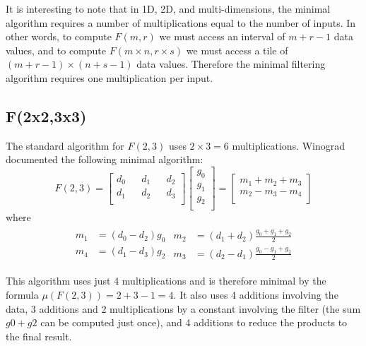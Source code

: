 \documentclass[10pt,twocolumn,letterpaper]{article}
\begin{document}
It is interesting to note that in 1D, 2D, and multi-dimensions, the minimal algorithm requires a number of multiplications equal to the number of inputs. In other words, to compute $F(m,r)$ we must access an interval  of $m+r-1$ data values, and to compute $F(m \times n, r \times s)$ we must access a tile of $(m+r-1) \times (n+s-1)$ data values. Therefore the minimal filtering algorithm requires one multiplication per input.

\subsection{F(2x2,3x3)}

The standard algorithm for $F(2,3)$ uses $2 \times 3 = 6$ multiplications. Winograd~\cite[p.~43]{winograd1980arithmetic} documented the following minimal algorithm:
\begin{equation} \label{eq:F_2_3}
F(2,3) = \begin{bmatrix}
d_0 && d_1 && d_2\\
d_1 && d_2 && d_3\\
\end{bmatrix}
\begin{bmatrix}
g_0\\
g_1\\
g_2\\
\end{bmatrix}
=
\begin{bmatrix}
m_1+m_2+m_3\\
m_2-m_3-m_4\\
\end{bmatrix}
\end{equation}
where
\begin{align*}
\begin{split}
m_1 &= (d_0-d_2) g_0 \\
m_4 &= (d_1-d_3) g_2
\end{split}
\begin{split}
m_2 &= (d_1+d_2) \frac{g_0+g_1+g_2}{2} \\
m_3 &= (d_2-d_1) \frac{g_0-g_1+g_2}{2}
\end{split}
\end{align*}

This algorithm uses just 4 multiplications and is therefore minimal by the formula $\mu (F(2,3)) = 2+3-1=4$. It also uses 4 additions involving the data, 3 additions and 2 multiplications by a constant involving the filter (the sum $g0+g2$ can be computed just once), and 4 additions to reduce the products to the final result.
\end{document}
